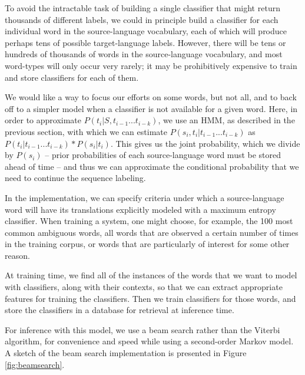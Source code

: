 To avoid the intractable task of building a single classifier that might return
thousands of different labels, we could in principle build a classifier for
each individual word in the source-language vocabulary, each of which will
produce perhaps tens of possible target-language labels. However, there will be
tens or hundreds of thousands of words in the source-language vocabulary, and
most word-types will only occur very rarely; it may be prohibitively expensive
to train and store classifiers for each of them.

We would like a way to focus our efforts on some words, but not all, and to
back off to a simpler model when a classifier is not available for a given
word. Here, in order to approximate $P(t_i | S, t_{i-1}...t_{i-k})$,
we use an HMM, as described in the previous section, with which we can estimate
$P(s_i, t_i | t_{i-1}...t_{i-k})$ as  
$P(t_i | t_{i-1}...t_{i-k}) * P(s_i | t_i)$.
This gives us the joint probability, which we divide by $P(s_i)$
-- prior probabilities of each source-language word must be stored ahead of
time -- and thus we can approximate the conditional probability that we need to
continue the sequence labeling.

In the implementation, we can specify criteria under which a source-language
word will have its translations explicitly modeled with a maximum entropy
classifier. When training a system, one might choose, for example, the 100 most
common ambiguous words, all words that are observed a certain number of times
in the training corpus, or words that are particularly of interest for some
other reason.

At training time, we find all of the instances of the words that we want to
model with classifiers, along with their contexts, so that we can extract
appropriate features for training the classifiers. Then we train classifiers
for those words, and store the classifiers in a database for retrieval at
inference time.

For inference with this model, we use a beam search rather than the Viterbi
algorithm, for convenience and speed while using a second-order Markov model.
A sketch of the beam search implementation is presented in Figure
\ref{fig:beamsearch}.

